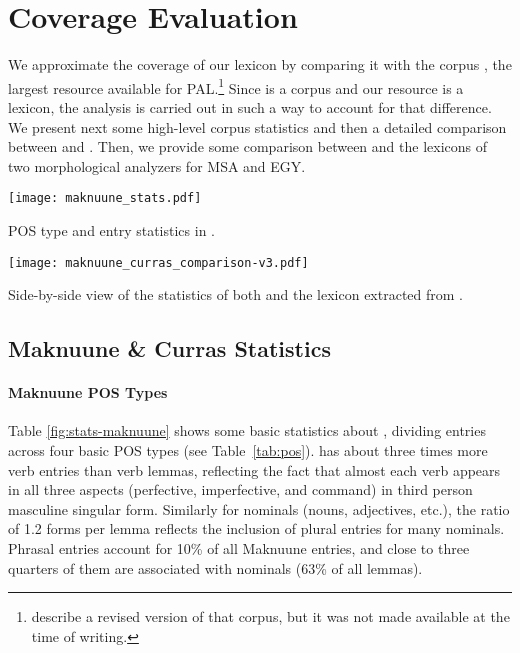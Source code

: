 \section*{Coverage Evaluation}
%
\label{eval}
We approximate the coverage of our lexicon by comparing it with the {\curras} corpus \citep{Jarrar:2016:curras}, the largest resource available for PAL.\footnote{\citet{alhaff-EtAl:2022:LREC} describe a revised version of that corpus, but it was not made available at the time of writing.} Since \curras is a corpus and our resource is a lexicon, the analysis is carried out in such a way to account for that difference. 
%
We  present next some high-level corpus statistics and then a detailed comparison between \maknuune and \curras.
%
Then, we  provide some comparison between \maknuune and the lexicons of two morphological analyzers for MSA and EGY.

\begin{table}[t]
    \centering
    \texttt{[image: maknuune\_stats.pdf]}
    \caption{POS type and entry  statistics in \maknuune.}
    \label{fig:stats-maknuune}
\end{table}

\begin{table}[t]
    \centering
\texttt{[image: maknuune\_curras\_comparison-v3.pdf]}
    \caption{Side-by-side view of the statistics of both \maknuune and the lexicon extracted from \curras.}
    \label{fig:stats-comp}
\end{table}

\subsection*{Maknuune \& Curras Statistics}
\paragraph{Maknuune POS Types}
Table \ref{fig:stats-maknuune} shows some basic statistics about \maknuune, dividing entries across four basic POS types (see Table~\ref{tab:pos}).
\maknuune has about three times more verb entries than verb lemmas, reflecting the fact that almost each verb appears in all three aspects (perfective, imperfective, and command) in third person masculine singular form. Similarly for nominals (nouns, adjectives, etc.), the ratio of 1.2 forms per lemma reflects the inclusion of plural entries for many nominals. %
Phrasal entries account for 10\% of all Maknuune entries, and close to three quarters of them are associated with nominals (63\% of all lemmas). 

